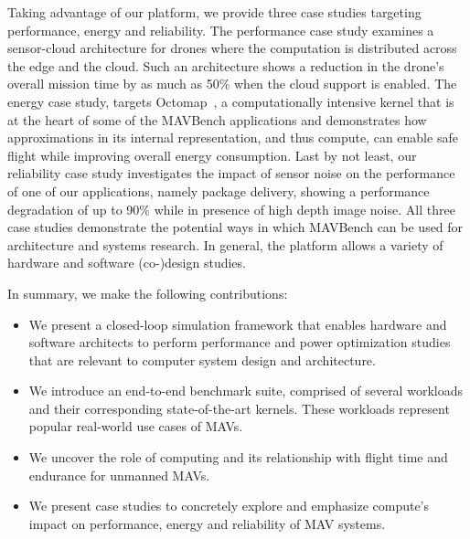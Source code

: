 Taking advantage of our platform, we provide three case studies targeting performance, energy and reliability. The performance case study examines a sensor-cloud architecture for drones where the computation is distributed across the edge and the cloud. Such an architecture shows a reduction in the drone's overall mission time by as much as 50\% when the cloud support is enabled. The energy case study, targets Octomap~\cite{octomap}, a computationally intensive kernel that is at the heart of some of the MAVBench applications and demonstrates how approximations in its internal representation, and thus compute, can enable safe flight while improving overall energy consumption. Last by not least, our reliability case study investigates the impact of sensor noise on the performance of one of our applications, namely package delivery, showing a performance degradation of up to 90\% while in presence of high depth image noise. All three case studies demonstrate the potential ways in which MAVBench can be used for architecture and systems research. In general, the platform allows a variety of hardware and software (co-)design studies.


In summary, we make the following contributions:

\begin{itemize}
    \item We present a closed-loop simulation framework that enables hardware and software architects to perform performance and power optimization studies that are relevant to computer system design and architecture.
    \item We introduce an end-to-end benchmark suite, comprised of several workloads and their corresponding state-of-the-art kernels. These workloads represent popular real-world use cases of MAVs.
    \item We uncover the role of computing and its relationship with flight time and endurance for unmanned MAVs.
    \item We present case studies to concretely explore and emphasize compute's impact on performance, energy and reliability of MAV systems.

\end{itemize}


